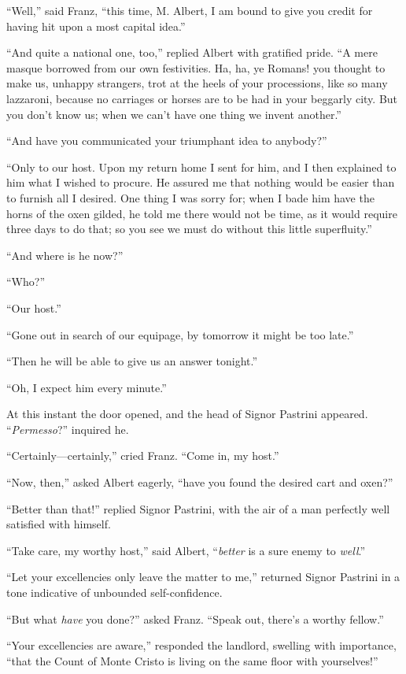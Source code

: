 “Well,” said Franz, “this time, M. Albert, I am bound to give you
credit for having hit upon a most capital idea.”

“And quite a national one, too,” replied Albert with gratified pride.
“A mere masque borrowed from our own festivities. Ha, ha, ye Romans!
you thought to make us, unhappy strangers, trot at the heels of your
processions, like so many lazzaroni, because no carriages or horses are
to be had in your beggarly city. But you don’t know us; when we can’t
have one thing we invent another.”

“And have you communicated your triumphant idea to anybody?”

“Only to our host. Upon my return home I sent for him, and I then
explained to him what I wished to procure. He assured me that nothing
would be easier than to furnish all I desired. One thing I was sorry
for; when I bade him have the horns of the oxen gilded, he told me
there would not be time, as it would require three days to do that; so
you see we must do without this little superfluity.”

“And where is he now?”

“Who?”

“Our host.”

“Gone out in search of our equipage, by tomorrow it might be too late.”

“Then he will be able to give us an answer tonight.”

“Oh, I expect him every minute.”

At this instant the door opened, and the head of Signor Pastrini
appeared. “\textit{Permesso}?” inquired he.

“Certainly—certainly,” cried Franz. “Come in, my host.”

“Now, then,” asked Albert eagerly, “have you found the desired cart and
oxen?”

“Better than that!” replied Signor Pastrini, with the air of a man
perfectly well satisfied with himself.

“Take care, my worthy host,” said Albert, “\textit{better} is a sure enemy to
\textit{well}.”

“Let your excellencies only leave the matter to me,” returned Signor
Pastrini in a tone indicative of unbounded self-confidence.

“But what \textit{have} you done?” asked Franz. “Speak out, there’s a worthy
fellow.”

“Your excellencies are aware,” responded the landlord, swelling with
importance, “that the Count of Monte Cristo is living on the same floor
with yourselves!”


